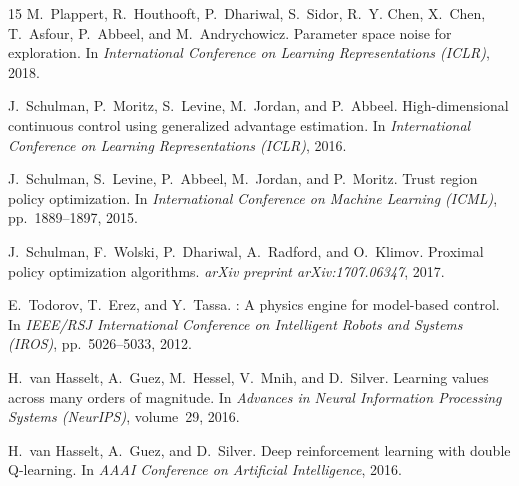 \documentclass{article}
\begin{document}
\begin{thebibliography}{15}
M.~Plappert, R.~Houthooft, P.~Dhariwal, S.~Sidor, R.~Y. Chen, X.~Chen, T.~Asfour, P.~Abbeel, and M.~Andrychowicz.
\newblock Parameter space noise for exploration.
\newblock In \emph{International Conference on Learning Representations (ICLR)}, 2018.

J.~Schulman, P.~Moritz, S.~Levine, M.~Jordan, and P.~Abbeel.
\newblock High-dimensional continuous control using generalized advantage estimation.
\newblock In \emph{International Conference on Learning Representations (ICLR)}, 2016.

J.~Schulman, S.~Levine, P.~Abbeel, M.~Jordan, and P.~Moritz.
\newblock Trust region policy optimization.
\newblock In \emph{International Conference on Machine Learning (ICML)}, pp.\ 1889--1897, 2015.

J.~Schulman, F.~Wolski, P.~Dhariwal, A.~Radford, and O.~Klimov.
\newblock Proximal policy optimization algorithms.
\newblock \emph{arXiv preprint arXiv:1707.06347}, 2017.

E.~Todorov, T.~Erez, and Y.~Tassa.
: A physics engine for model-based control.
\newblock In \emph{IEEE/RSJ International Conference on Intelligent Robots and Systems (IROS)}, pp.\ 5026--5033, 2012.

H.~van Hasselt, A.~Guez, M.~Hessel, V.~Mnih, and D.~Silver.
\newblock Learning values across many orders of magnitude.
\newblock In \emph{Advances in Neural Information Processing Systems (NeurIPS)}, volume~29, 2016.

H.~van Hasselt, A.~Guez, and D.~Silver.
\newblock Deep reinforcement learning with double {Q}-learning.
\newblock In \emph{AAAI Conference on Artificial Intelligence}, 2016.

\end{thebibliography}
\end{document}
